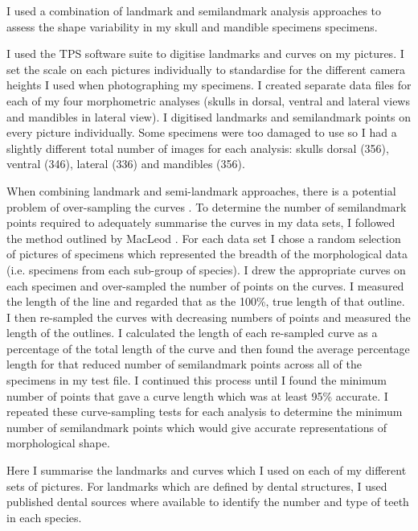 	I used a combination of landmark and semilandmark analysis approaches to assess the shape variability in my skull and mandible specimens specimens. 

	I used the TPS software suite \citep{Rohlf2013} to digitise landmarks and curves on my pictures. I set the scale on each pictures individually to standardise for the different camera heights I used when photographing my specimens. I created separate data files for each of my four morphometric analyses (skulls in dorsal, ventral and lateral views and mandibles in lateral view). I digitised landmarks and semilandmark points on every picture individually. Some specimens were too damaged to use so I had a slightly different total number of images for each analysis: skulls dorsal (356), ventral (346), lateral (336) and mandibles (356).

	When combining landmark and semi-landmark approaches, there is a potential problem of over-sampling the curves \citep{MacLeod2012}. To determine the number of semilandmark points required to adequately summarise the curves in my data sets,  I followed the method outlined by MacLeod \citeyearpar{MacLeod2012}. For each data set I chose a random selection of pictures of specimens which represented the breadth of the morphological data (i.e. specimens from each sub-group of species). I drew the appropriate curves on each specimen and over-sampled the number of points on the curves. I measured the length of the line and regarded that as the 100\%, true length of that outline. I then re-sampled the curves with decreasing numbers of points and measured the length of the outlines. I calculated the length of each re-sampled curve as a percentage of the total length of the curve and then found the average percentage length for that reduced number of semilandmark points across all of the specimens in my test file. I continued this process until I found the minimum number of points that gave a curve length which was at least 95\% accurate.  I repeated these curve-sampling tests for each analysis to determine the minimum number of semilandmark points which would give accurate representations of morphological shape.
	
	Here I summarise the landmarks and curves which I used on each of my different sets of pictures. For landmarks which are defined by dental structures, I used published dental sources \citep{Repenning1967, Eisenberg1969, Nowak1983, MacPhee1987, KnoxJones1992, Davis1997, Querouil2001, Nagorsen2002, Wilson2005, Goodman2006, Karatas2007, Hoffmann2008, Asher2008, Lin2010,  Muldoon2009} where available to identify the number and type of teeth in each species.
	
